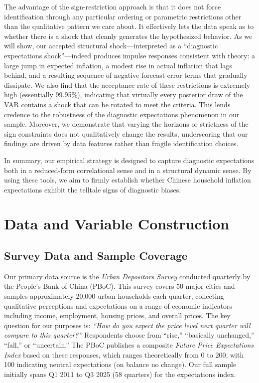 \documentclass[12pt]{article}
\begin{document}
The advantage of the sign-restriction approach is that it does not force identification through any particular ordering or parametric restrictions other than the qualitative pattern we care about. It effectively lets the data speak as to whether there is a shock that cleanly generates the hypothesized behavior. As we will show, our accepted structural shock—interpreted as a “diagnostic expectations shock”—indeed produces impulse responses consistent with theory: a large jump in expected inflation, a modest rise in actual inflation that lags behind, and a resulting sequence of negative forecast error terms that gradually dissipate. We also find that the acceptance rate of these restrictions is extremely high (essentially 99.95\%), indicating that virtually every posterior draw of the VAR contains a shock that can be rotated to meet the criteria. This lends credence to the robustness of the diagnostic expectations phenomenon in our sample. Moreover, we demonstrate that varying the horizons or strictness of the sign constraints does not qualitatively change the results, underscoring that our findings are driven by data features rather than fragile identification choices.

In summary, our empirical strategy is designed to capture diagnostic expectations both in a reduced-form correlational sense and in a structural dynamic sense. By using these tools, we aim to firmly establish whether Chinese household inflation expectations exhibit the telltale signs of diagnostic biases.

\section{Data and Variable Construction}\label{sec:data}
\subsection{Survey Data and Sample Coverage}
Our primary data source is the \textit{Urban Depositors Survey} conducted quarterly by the People's Bank of China (PBoC). This survey covers 50 major cities and samples approximately 20,000 urban households each quarter, collecting qualitative perceptions and expectations on a range of economic indicators including income, employment, housing prices, and overall prices. The key question for our purposes is: \emph{“How do you expect the price level next quarter will compare to this quarter?”} Respondents choose from “rise,” “basically unchanged,” “fall,” or “uncertain.” The PBoC publishes a composite \emph{Future Price Expectations Index} based on these responses, which ranges theoretically from 0 to 200, with 100 indicating neutral expectations (on balance no change). Our full sample initially spans Q1 2011 to Q3 2025 (58 quarters) for the expectations index.
\end{document}
